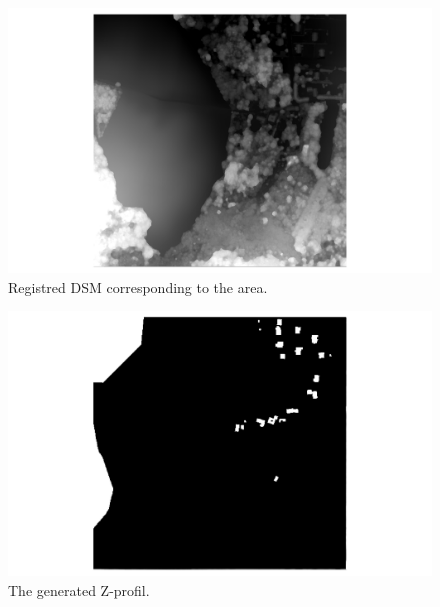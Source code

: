 \documentclass[a4paper, 11pt]{article}
\begin{document}
	\begin{figure}[H]
		\begin{center}
			\caption{\label{img::dsm} Registred DSM corresponding to the area.}
			\includegraphics[scale=.4]{images/raster/elancourt/dsm.png}
		\end{center}
	\end{figure}
	
	\begin{figure}[H]
		\begin{center}
			\caption{\label{img::a_dsm} The generated Z-profil.}
			\includegraphics[scale=.4]{images/raster/elancourt/artificial_dsm.png}
		\end{center}
	\end{figure}
	
\end{document}
